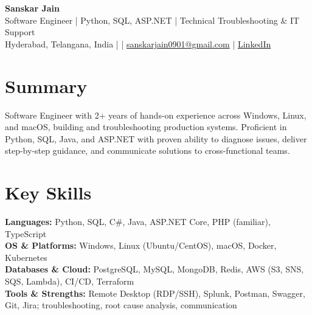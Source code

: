 \documentclass[10pt,letterpaper]{article}
\begin{document}
\begin{center}
    {\Large \textbf{Sanskar Jain}} \\
    Software Engineer | Python, SQL, ASP.NET | Technical Troubleshooting \& IT Support \\
    Hyderabad, Telangana, India \enspace |  \enspace | \enspace
    \href{mailto:sanskarjain0901@gmail.com}{sanskarjain0901@gmail.com} \enspace | \enspace
    \href{https://www.linkedin.com/in/sanskar-jain0901/}{LinkedIn}
\end{center}

\section*{Summary}
Software Engineer with 2+ years of hands-on experience across Windows, Linux, and macOS, building and troubleshooting production systems. Proficient in Python, SQL, Java, and ASP.NET with proven ability to diagnose issues, deliver step-by-step guidance, and communicate solutions to cross-functional teams.

\section*{Key Skills}
\textbf{Languages:} Python, SQL, C\#, Java, ASP.NET Core, PHP (familiar), TypeScript \\
\textbf{OS \& Platforms:} Windows, Linux (Ubuntu/CentOS), macOS, Docker, Kubernetes \\
\textbf{Databases \& Cloud:} PostgreSQL, MySQL, MongoDB, Redis, AWS (S3, SNS, SQS, Lambda), CI/CD, Terraform \\
\textbf{Tools \& Strengths:} Remote Desktop (RDP/SSH), Splunk, Postman, Swagger, Git, Jira; troubleshooting, root cause analysis, communication
\end{document}
